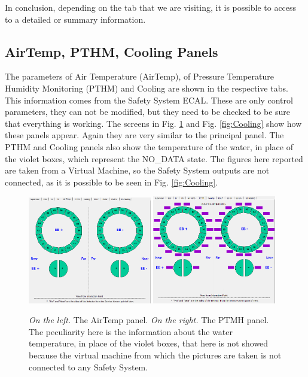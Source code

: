 \documentclass[12pt]{article}
\begin{document}
In conclusion, depending on the tab that we are visiting, it is possible to access to a detailed or summary information. 


\subsection{AirTemp, PTHM, Cooling Panels}
The parameters of Air Temperature (AirTemp), of Pressure Temperature Humidity Monitoring (PTHM) and Cooling are shown in the respective tabs. This information comes from the Safety System ECAL. These are only control parameters, they can not be modified, but they need to be checked to be sure that everything is working. The screens in Fig. \ref{fig:AirPTHM} and Fig. \ref{fig:Cooling} show how these panels appear. Again they are very similar to the principal panel. The PTHM and Cooling panels also show the temperature of the water, in place of the violet boxes, which represent the NO\_DATA state. The figures here reported are taken from a Virtual Machine, so the Safety System outputs are not connected, as it is possible to be seen in Fig. \ref{fig:Cooling}.
\begin{figure}[!h]
	\centering
	\includegraphics[width=0.48\textwidth]{Pics/AirTemp.png}
	\quad 
	\includegraphics[width=0.48\textwidth]{Pics/PTMH.png}
	\caption{\textit{On the left.} The AirTemp panel. \textit{On the right.} The PTMH panel. The peculiarity here is the information about the water temperature, in place of the violet boxes, that here is not showed because the virtual machine from which the pictures are taken is not connected to any Safety System.}
	\label{fig:AirPTHM}
\end{figure}
\end{document}

